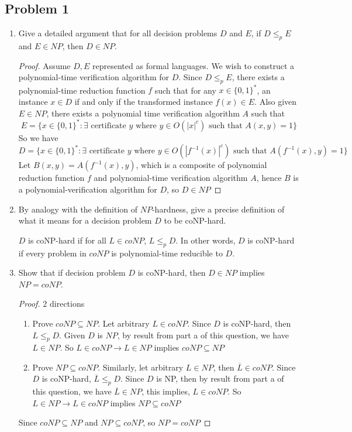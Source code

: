 \documentclass[11pt]{article}
\begin{document}
\subsection*{Problem 1}


\begin{enumerate}
    \item Give a detailed argument that for all decision problems $D$ and $E$, if $D\leq_p E$ and $E\in NP$, then $D\in NP$.
    \begin{proof}
        Assume $D, E$ represented as formal languages. We wish to construct a polynomial-time verification algorithm for $D$. Since $D\leq_p E$, there exists a polynomial-time reduction function $f$ such that for any $x\in \{0,1\}^*$, an instance $x\in D$ if and only if the transformed instance $f(x) \in E$. Also given $E\in NP$, there exists a polynomial time verification algorithm $A$ such that 
        \[
            E = \{ x\in \{0,1\}^* : \exists \text{ certificate } y \text{ where } y \in O(|x|^c) \text{ such that } A(x,y)=1 \}
        \]
        So we have 
        \[
            D =  \{ x\in \{0,1\}^* : \exists \text{ certificate } y \text{ where } y \in O(|f^{-1}(x)|^c) \text{ such that } A(f^{-1}(x),y)=1 \}
        \]
        Let $B(x,y) = A(f^{-1}(x),y)$, which is a composite of polynomial reduction function $f$ and polynomial-time verification algorithm $A$, hence $B$ is a polynomial-verification algorithm for $D$, so $D\in NP$
    \end{proof}
    \item By analogy with the definition of  $NP$-hardness, give a precise definition of what it means for a decision problem $D$ to be coNP-hard.
    \begin{solution}
        $D$ is coNP-hard if for all $L\in coNP$, $L\leq_p D$. In other words, $D$ is coNP-hard if every problem in $coNP$ is polynomial-time reducible to $D$.
    \end{solution}
    \item Show that if decision problem $D$ is coNP-hard, then $D \in NP$ implies $NP = coNP$.
    \begin{proof}
        2 directions
        \begin{enumerate}
            \item Prove $coNP \subseteq NP$. Let arbitrary $L\in coNP$. Since $D$ is coNP-hard, then $L\leq_p D$. Given $D$ is $NP$, by result from part a of this question, we have $L \in NP$. So $L\in coNP \to L\in NP$ implies $coNP\subseteq NP$ 
            \item Prove $NP\subseteq coNP$. Similarly, let arbitrary $L\in NP$, then $\overline{L}\in coNP$. Since $D$ is coNP-hard, $\overline{L} \leq_p D$. Since $D$ is NP, then by result from part a of this question, we have $\overline{L} \in NP$, this implies, $L\in coNP$. So $L\in NP \to L\in coNP$ implies $NP \subseteq coNP$
        \end{enumerate}
        Since $coNP\subseteq NP$ and $NP \subseteq coNP$, so $NP = coNP$
    \end{proof}
\end{enumerate}
\end{document}
